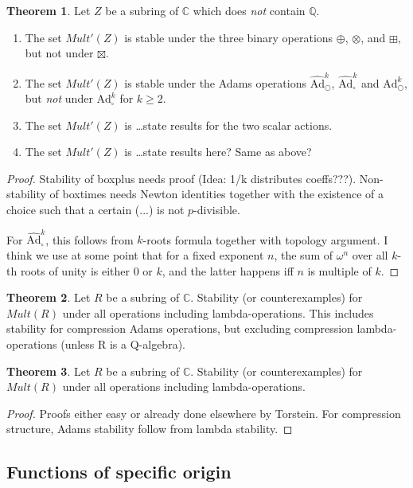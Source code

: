 \documentclass[a4paper]{article}
\theoremstyle{definition}
\newtheorem{theorem}{Theorem}[section]
\theoremstyle{remark}
\newcommand{\adam}[1]{\text{Ad}^{#1}_{\bigcirc}}
\newcommand{\hatadam}[1]{\widehat{\text{Ad}}^{#1}_{\bigcirc}}
\newcommand{\boxadam}[1]{\text{Ad}^{#1}_{\square}}
\newcommand{\hatboxadam}[1]{\widehat{\text{Ad}}^{#1}_{\square}}
\newcommand{\Q}{\mathbb{Q}}
\newcommand{\C}{\mathbb{C}}
\begin{document}
\begin{theorem}
Let $Z$ be a subring of $\C$ which does \emph{not} contain $\Q$.
\begin{enumerate}
\item The set $Mult'(Z)$ is stable under the three binary operations $\oplus$, $\otimes$, and $\boxplus$, but not under $\boxtimes$.
\item The set $Mult'(Z)$ is stable under the Adams operations $\hatadam{k}$, $\hatboxadam{k}$ and $\adam{k}$, but \emph{not} under $\boxadam{k}$ for $k \geq 2$. 
\item The set $Mult'(Z)$ is \ldots state results for the two scalar actions.
\item The set $Mult'(Z)$ is \ldots state results here? Same as above?
\end{enumerate}
\end{theorem}

\begin{proof}
Stability of boxplus needs proof (Idea: 1/k distributes coeffs???). Non-stability of boxtimes needs Newton identities together with the existence of a choice such that a certain (...) is not $p$-divisible.

For $\hatboxadam{k}$, this follows from $k$-roots formula together with topology argument. I think we use at some point that for a fixed exponent $n$, the sum of $\omega^n$ over all $k$-th roots of unity is either 0 or $k$, and the latter happens iff $n$ is multiple of $k$. 
\end{proof}


\begin{theorem}
Let $R$ be a subring of $\mathbb{C}$. Stability (or counterexamples) for $Mult(R)$ under all operations including lambda-operations. This includes stability for compression Adams operations, but excluding compression lambda-operations (unless R is a Q-algebra).
\end{theorem}



\begin{theorem}
Let $R$ be a subring of $\mathbb{C}$. Stability (or counterexamples) for $Mult(R)$ under all operations including lambda-operations.
\end{theorem}
\begin{proof}
Proofs either easy or already done elsewhere by Torstein. For compression structure, Adams stability follow from lambda stability.
\end{proof}


\subsection{Functions of specific origin}
\end{document}
